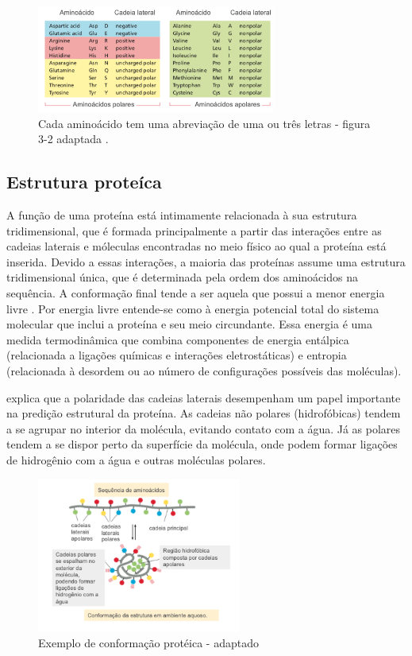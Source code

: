 \begin{figure}[H]
     \centering
     \includegraphics[width=0.7\textwidth]{figuras/20Aminoacidos.png}
     \caption{Cada aminoácido tem uma abreviação de uma ou três letras - figura 3-2 adaptada \cite{Bio}.}
\end{figure}


\subsection{Estrutura proteíca}

A função de uma proteína está intimamente relacionada à sua estrutura tridimensional,
que é formada principalmente a partir das interações entre as cadeias laterais e móleculas encontradas no meio físico ao qual
a proteína está inserida. Devido a essas interações, a maioria das proteínas assume uma estrutura tridimensional única,
que é determinada pela ordem dos aminoácidos na sequência. 
A conformação final tende a ser aquela que possui a menor energia livre \cite{Bio}.
Por energia livre entende-se como à energia potencial total do sistema molecular que inclui a proteína e seu meio circundante. 
Essa energia é uma medida termodinâmica que combina componentes de energia entálpica (relacionada a ligações químicas e interações eletrostáticas) 
e entropia (relacionada à desordem ou ao número de configurações possíveis das moléculas).

\cite{Bio} explica que a polaridade das cadeias laterais desempenham um papel importante na predição estrutural da proteína. 
As cadeias não polares (hidrofóbicas) tendem a se agrupar no interior da molécula, 
evitando contato com a água. 
Já as polares tendem a se dispor perto da superfície da molécula,
onde podem formar ligações de hidrogênio com a água e outras moléculas polares. 

\begin{figure}[H]
     \centering
     \includegraphics[width=0.6\textwidth]{figuras/ConformacaoProteica.png}
     \caption{Exemplo de conformação protéica \cite{Bio} - adaptado}
\end{figure}


